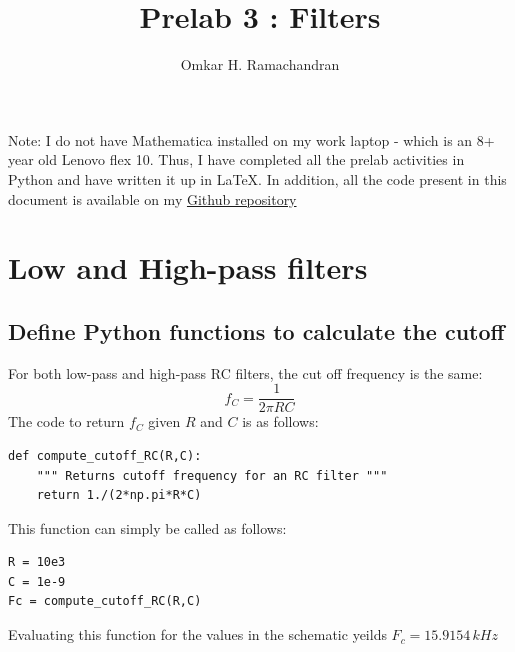 \documentclass[english]{article}
\begin{document}
\title{Prelab 3 : Filters}
\author{Omkar H. Ramachandran}

\maketitle

Note: I do not have Mathematica installed on my work laptop - which is an 8+ 
year old Lenovo flex 10. Thus, I have completed all the prelab activities in
Python and have written it up in \LaTeX. In addition, all the code present in
this document is available on my 
\href{https://github.com/ShadowWarden/electronics}{Github repository}

\section{Low and High-pass filters}
\subsection{Define Python functions to calculate the cutoff}
For both low-pass and high-pass RC filters, the cut off frequency is the same:
$$ f_{C} = \frac{1}{2\pi RC} $$
The code to return $f_{C}$ given $R$ and $C$ is as follows:
\begin{lstlisting}
def compute_cutoff_RC(R,C):
    """ Returns cutoff frequency for an RC filter """
    return 1./(2*np.pi*R*C)
\end{lstlisting}
This function can simply be called as follows:
\begin{lstlisting}
R = 10e3
C = 1e-9
Fc = compute_cutoff_RC(R,C)
\end{lstlisting}
Evaluating this function for the values in the schematic yeilds
$F_c = 15.9154\, kHz$
\end{document}

